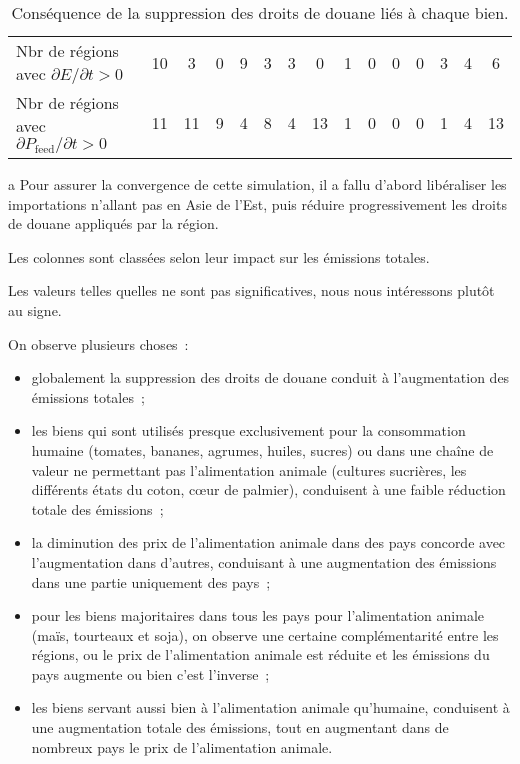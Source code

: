 \begin{table}[hbt!]
{\begin{tabular}{l|cccc|ccccccc|ccc}
            Nbr de régions avec $\partial E/\partial t >0$               & 10              & 3               & 0       & 9       & 3       & 3       & 0            & 1       & 0     & 0     & 0     & 3                 & 4       & 6       \\
            Nbr de régions avec $\partial P_\text{feed}/ \partial t > 0$ & 11              & 11              & 9       & 4       & 8       & 4       & 13           & 1       & 0     & 0     & 0     & 1                 & 4       & 13
        \end{tabular}%
    }
    \begin{tablenotes}
        \item [a] Pour assurer la convergence de cette simulation, il a fallu d'abord libéraliser les importations n'allant pas en Asie de l'Est, puis réduire progressivement les droits de douane appliqués par la région.
        \item Les colonnes sont classées selon leur impact sur les émissions totales.
        \item Les valeurs telles quelles ne sont pas significatives, nous nous intéressons plutôt au signe.
    \end{tablenotes}
    \caption{Conséquence de la suppression des droits de douane liés à chaque bien.}
    \label{tab:res_item}
\end{table}

On observe plusieurs choses~:
\begin{itemize}
    \item globalement la suppression des droits de douane conduit à l'augmentation des émissions totales~;
    \item les biens qui sont utilisés presque exclusivement pour la consommation humaine (tomates, bananes, agrumes, huiles, sucres) ou dans une chaîne de valeur ne permettant pas l'alimentation animale (cultures sucrières, les différents états du coton, cœur de palmier), conduisent à une faible réduction totale des émissions~;
    \item la diminution des prix de l'alimentation animale dans des pays concorde avec l'augmentation dans d'autres, conduisant à une augmentation des émissions dans une partie uniquement des pays~;
    \item pour les biens majoritaires dans tous les pays pour l'alimentation animale (maïs, tourteaux et soja), on observe une certaine complémentarité entre les régions, ou le prix de l'alimentation animale est réduite et les émissions du pays augmente ou bien c'est l'inverse~;
    \item les biens servant aussi bien à l'alimentation animale qu'humaine, conduisent à une augmentation totale des émissions, tout en augmentant dans de nombreux pays le prix de l'alimentation animale.
\end{itemize}

